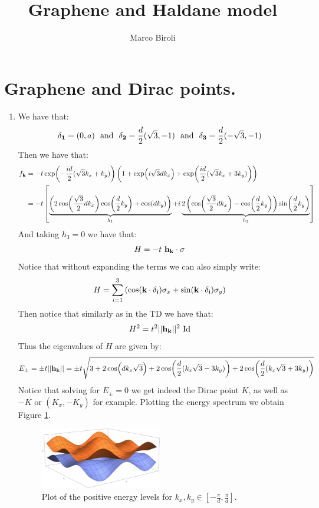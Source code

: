 \documentclass[10pt,a4paper]{article}
\author{Marco Biroli}
\title{Graphene and Haldane model}
\begin{document}
\maketitle

\section{Graphene and Dirac points.}

\begin{enumerate}
\item  We have that:
\[
\vb{\delta_1} = (0, a) \mbox{~~and~~} \vb{\delta_2} = \frac{d}{2} (\sqrt{3}, -1) \mbox{~~and~~} \vb{\delta_3} = \frac{d}{2} (-\sqrt{3}, -1)
\]
Then we have that:
\begin{align*}
f_{\vb{k}} &= - t \exp(-\frac{i d}{2} (\sqrt{3} k_x + k_y)) \left( 1 + \exp(i \sqrt{3} d k_x) + \exp(\frac{i d}{2} (\sqrt{3} k_x + 3 k_y)) \right) \\
&= - t\left[ \underbrace{\left( 2 \cos(\frac{\sqrt{3}}{2} d k_x) \cos(\frac{d}{2} k_y) + \cos(d k_y) \right)}_{h_1} + i \underbrace{2 \left( \cos(\frac{\sqrt{3}}{2} d k_x) - \cos(\frac{d}{2} k_y) \right) \sin(\frac{d}{2} k_y)}_{h_2}
 \right]
\end{align*}
And taking $h_3 = 0$ we have that:
\[
H = -t \, \, \vb{h}_{\vb{k}} \cdot \vb{\sigma}
\]
Notice that without expanding the terms we can also simply write:
\[
H = \sum_{i = 1}^3 \left( \cos(\vb{k} \cdot \vb{\delta_i} ) \sigma_x + \sin(\vb{k} \cdot \vb{\delta_i}) \sigma_y \right)
\]
Then notice that similarly as in the TD we have that:
\[
H^2 = t^2 || \vb{h}_{\vb{k}} ||^2 \text{ Id}
\]
Thus the eigenvalues of $H$ are given by:
\[
E_\pm = \pm t || \vb{h_{\vb{k}}} || = \pm t \sqrt{3 + 2 \cos(d k_x \sqrt{3}) + 2 \cos(\frac{d}{2} (k_x\sqrt{3} - 3 k_y)) + 2 \cos(\frac{d}{2}(k_x\sqrt{3} + 3k_y))}
\]
Notice that solving for $E_\pm = 0$ we get indeed the Dirac point $K$, as well as $-K$ or $(K_x, - K_y)$ for example. Plotting the energy spectrum we obtain Figure \ref{eigenplot}.
\begin{figure}
\centering
\includegraphics[width = 0.5\textwidth]{energylevels}
\caption{Plot of the positive energy levels for $k_x, k_y \in [-\frac{\pi}{d}, \frac{\pi}{d}]$.} \label{eigenplot}
\end{figure}


\end{enumerate}
\end{document}
